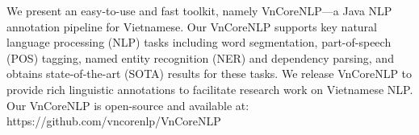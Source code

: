 We present an easy-to-use and fast toolkit, namely VnCoreNLP---a Java NLP annotation pipeline for Vietnamese. Our VnCoreNLP supports key natural language processing (NLP) tasks including  word segmentation, part-of-speech (POS) tagging, named entity recognition (NER) and dependency parsing, and obtains state-of-the-art (SOTA) results for these tasks.  We release VnCoreNLP to provide  rich linguistic annotations to facilitate research work on Vietnamese NLP.  Our VnCoreNLP is open-source and available at: https://github.com/vncorenlp/VnCoreNLP
